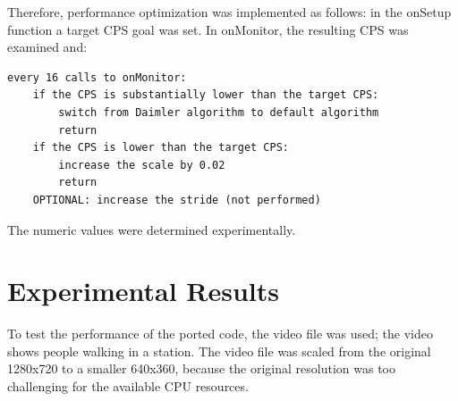 Therefore, performance optimization was implemented as follows:
in the onSetup function a target CPS goal was set.
In onMonitor, the resulting CPS was examined and:
\begin{verbatim}
every 16 calls to onMonitor:
    if the CPS is substantially lower than the target CPS:
        switch from Daimler algorithm to default algorithm
        return
    if the CPS is lower than the target CPS:
        increase the scale by 0.02
        return
    OPTIONAL: increase the stride (not performed)
\end{verbatim}
The numeric values were determined experimentally.

\section{Experimental Results}

To test the performance of the ported code, the video file
 was used; the video shows people
walking in a station.
The video file was scaled from the original 1280x720 to a smaller
640x360,
because the original resolution was too challenging
for the available CPU resources.

